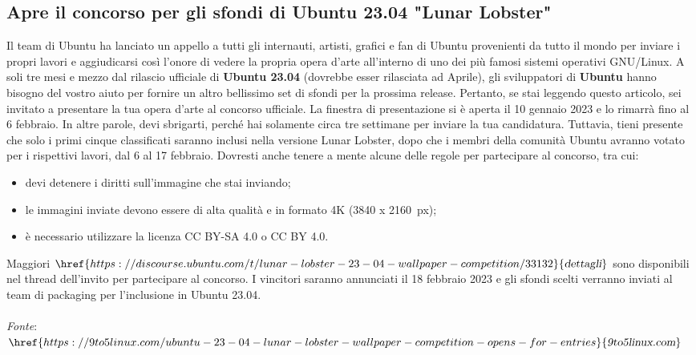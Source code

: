 \documentclass[a4paper,twoside]{article}
\begin{document}
\subsection{Apre il concorso per gli sfondi di Ubuntu 23.04 "Lunar Lobster"}
Il team di Ubuntu ha lanciato un appello a tutti gli internauti, artisti, grafici e fan di Ubuntu provenienti da tutto il mondo per inviare i propri lavori e aggiudicarsi così l'onore di vedere la propria opera d'arte all'interno di uno dei più famosi sistemi operativi GNU/Linux. A soli tre mesi e mezzo dal rilascio ufficiale di \textbf{Ubuntu 23.04} (dovrebbe esser rilasciata ad Aprile), gli sviluppatori di \textbf{Ubuntu} hanno bisogno del vostro aiuto per fornire un altro bellissimo set di sfondi per la prossima release. Pertanto, se stai leggendo questo articolo, sei invitato a presentare la tua opera d'arte al concorso ufficiale. La finestra di presentazione si è aperta il 10 gennaio 2023 e lo rimarrà fino al 6 febbraio. In altre parole, devi sbrigarti, perché hai solamente circa tre settimane per inviare la tua candidatura. Tuttavia, tieni presente che solo i primi cinque classificati saranno inclusi nella versione Lunar Lobster, dopo che i membri della comunità Ubuntu avranno votato per i rispettivi lavori, dal 6 al 17 febbraio. Dovresti anche tenere a mente alcune delle regole per partecipare al concorso, tra cui:

\begin{itemize}
\item devi detenere i diritti sull'immagine che stai inviando;
\item le immagini inviate devono essere di alta qualità e in formato 4K (3840 x \SI{2160}{px}); 
\item è necessario utilizzare la licenza CC BY-SA 4.0 o CC BY 4.0.
\end{itemize}

Maggiori $\href{https://discourse.ubuntu.com/t/lunar-lobster-23-04-wallpaper-competition/33132}{\textsl{dettagli}}$ sono disponibili nel thread dell'invito per partecipare al concorso. I vincitori saranno annunciati il 18 febbraio 2023 e gli sfondi scelti verranno inviati al team di packaging per l'inclusione in Ubuntu 23.04.\\
\\
\textit{Fonte}:\\
$\href{https://9to5linux.com/ubuntu-23-04-lunar-lobster-wallpaper-competition-opens-for-entries}{\textsl{9to5linux.com}}$
\end{document}
